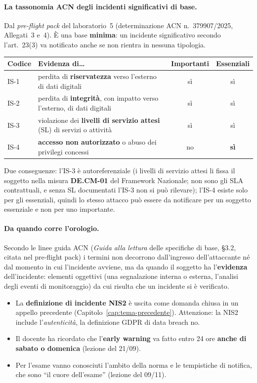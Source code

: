 \paragraph{La tassonomia ACN degli incidenti significativi di base.} Dal \emph{pre-flight pack} del
laboratorio~5 (determinazione ACN n.~379907/2025, Allegati~3 e~4). È una base \textbf{minima}: un
incidente significativo secondo l'art.~23(3) va notificato anche se non rientra in nessuna tipologia.
\begin{center}
\small
\begin{tabularx}{\linewidth}{l X c c}
\toprule
\textbf{Codice} & \textbf{Evidenza di\ldots} & \textbf{Importanti} & \textbf{Essenziali}\\
\midrule
IS-1 & perdita di \textbf{riservatezza} verso l'esterno di dati digitali & sì & sì\\
IS-2 & perdita di \textbf{integrità}, con impatto verso l'esterno, di dati digitali & sì & sì\\
IS-3 & violazione dei \textbf{livelli di servizio attesi} (SL) di servizi o attività & sì & sì\\
IS-4 & \textbf{accesso non autorizzato} o abuso dei privilegi concessi & no & \textbf{sì}\\
\bottomrule
\end{tabularx}
\end{center}
Due conseguenze: l'IS-3 è autoreferenziale (i livelli di servizio attesi li fissa il soggetto nella
misura \textbf{DE.CM-01} del Framework Nazionale; non sono gli SLA contrattuali, e senza SL documentati
l'IS-3 non si può rilevare); l'IS-4 esiste solo per gli essenziali, quindi lo stesso attacco può essere
da notificare per un soggetto essenziale e non per uno importante.

\paragraph{Da quando corre l'orologio.} Secondo le linee guida ACN (\emph{Guida alla lettura} delle
specifiche di base, §3.2, citata nel pre-flight pack) i termini non decorrono dall'ingresso
dell'attaccante né dal momento in cui l'incidente avviene, ma da quando il soggetto ha
l'\textbf{evidenza} dell'incidente: elementi oggettivi (una segnalazione interna o esterna, l'analisi
degli eventi di monitoraggio) da cui risulta che un incidente si è verificato.

\begin{esame}
\begin{itemize}
  \item La \textbf{definizione di incidente NIS2} è uscita come domanda chiusa in un appello
    precedente (Capitolo~\ref{cap:tema-precedente}). Attenzione: la NIS2 include
    l'\emph{autenticità}, la definizione GDPR di data breach no.
  \item Il docente ha ricordato che l'\textbf{early warning} va fatto entro 24 ore \textbf{anche di
    sabato o domenica} (lezione del 21/09).
  \item Per l'esame vanno conosciuti l'ambito della norma e le tempistiche di notifica, che sono ``il
    cuore dell'esame'' (lezione del 09/11).
\end{itemize}
\end{esame}

